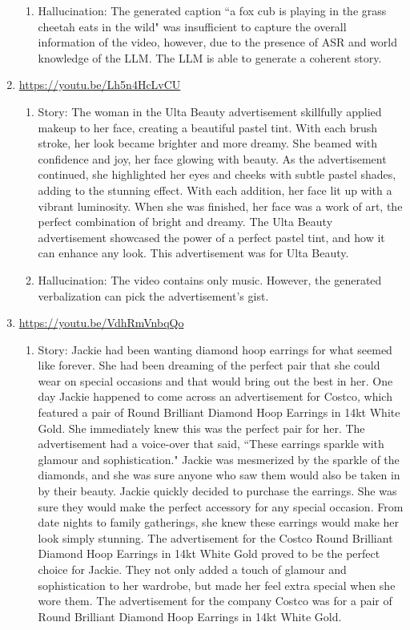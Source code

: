 \documentclass[hidelinks,11pt,a4paper]{report}
\begin{document}
\begin{enumerate}
\begin{enumerate}
        \item Hallucination: The generated caption ``a fox cub is playing in the grass cheetah eats in the wild" was insufficient to capture the overall information of the video, however, due to the presence of ASR and world knowledge of the LLM. The LLM is able to generate a coherent story. 
    \end{enumerate}

        \item \url{https://youtu.be/Lh5n4HcLvCU} 
        \begin{enumerate}
            \item Story: The woman in the Ulta Beauty advertisement skillfully applied makeup to her face, creating a beautiful pastel tint. With each brush stroke, her look became brighter and more dreamy. She beamed with confidence and joy, her face glowing with beauty. As the advertisement continued, she highlighted her eyes and cheeks with subtle pastel shades, adding to the stunning effect. With each addition, her face lit up with a vibrant luminosity. When she was finished, her face was a work of art, the perfect combination of bright and dreamy. The Ulta Beauty advertisement showcased the power of a perfect pastel tint, and how it can enhance any look. This advertisement was for Ulta Beauty.

            \item Hallucination: The video contains only music. However, the generated verbalization can pick the advertisement's gist. 
        \end{enumerate}
        
        \item \url{https://youtu.be/VdhRmVnbqQo} 
        \begin{enumerate}
            \item Story: Jackie had been wanting diamond hoop earrings for what seemed like forever. She had been dreaming of the perfect pair that she could wear on special occasions and that would bring out the best in her. One day Jackie happened to come across an advertisement for Costco, which featured a pair of Round Brilliant Diamond Hoop Earrings in 14kt White Gold. She immediately knew this was the perfect pair for her. The advertisement had a voice-over that said, “These earrings sparkle with glamour and sophistication." Jackie was mesmerized by the sparkle of the diamonds, and she was sure anyone who saw them would also be taken in by their beauty. Jackie quickly decided to purchase the earrings. She was sure they would make the perfect accessory for any special occasion. From date nights to family gatherings, she knew these earrings would make her look simply stunning. The advertisement for the Costco Round Brilliant Diamond Hoop Earrings in 14kt White Gold proved to be the perfect choice for Jackie. They not only added a touch of glamour and sophistication to her wardrobe, but made her feel extra special when she wore them. The advertisement for the company Costco was for a pair of Round Brilliant Diamond Hoop Earrings in 14kt White Gold.
            

\end{enumerate}
\end{enumerate}
\end{document}
